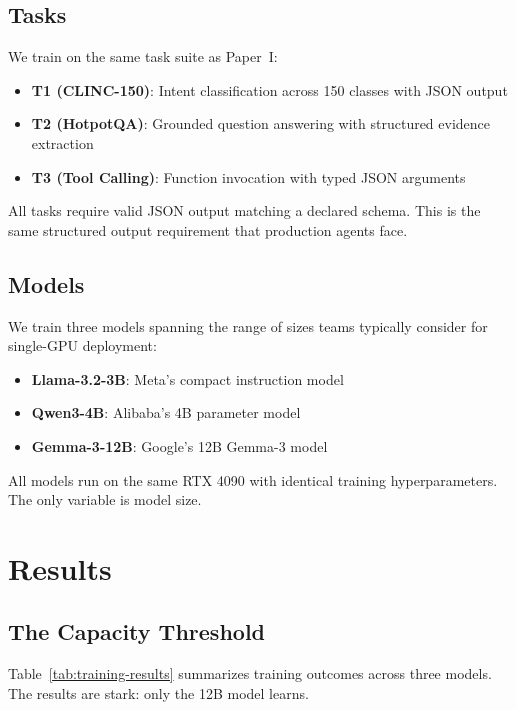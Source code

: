 \documentclass[11pt]{article}
\begin{document}
\subsection{Tasks}

We train on the same task suite as Paper~I:
\begin{itemize}[leftmargin=12pt]
    \item \textbf{T1 (CLINC-150)}: Intent classification across 150 classes with JSON output
    \item \textbf{T2 (HotpotQA)}: Grounded question answering with structured evidence extraction
    \item \textbf{T3 (Tool Calling)}: Function invocation with typed JSON arguments
\end{itemize}

All tasks require valid JSON output matching a declared schema.
This is the same structured output requirement that production agents face.

\subsection{Models}

We train three models spanning the range of sizes teams typically consider for single-GPU deployment:
\begin{itemize}[leftmargin=12pt]
    \item \textbf{Llama-3.2-3B}: Meta's compact instruction model
    \item \textbf{Qwen3-4B}: Alibaba's 4B parameter model
    \item \textbf{Gemma-3-12B}: Google's 12B Gemma-3 model
\end{itemize}

All models run on the same RTX 4090 with identical training hyperparameters.
The only variable is model size.

\section{Results}
\label{sec:results}

\subsection{The Capacity Threshold}

Table~\ref{tab:training-results} summarizes training outcomes across three models.
The results are stark: only the 12B model learns.
\end{document}
